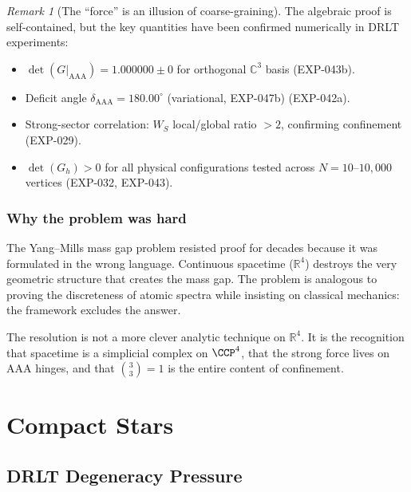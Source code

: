 \documentclass[12pt]{article}
\theoremstyle{remark}
\newtheorem{remark}[theorem]{Remark}
\theoremstyle{definition}
\newcommand{\CC}{\mathbb{C}}
\newcommand{\RR}{\mathbb{R}}
\begin{document}
\begin{remark}[The ``force'' is an illusion of coarse-graining]
The algebraic proof is self-contained, but the key quantities have been
confirmed numerically in DRLT experiments:

\begin{itemize}
\item $\det(G|_{\mathrm{AAA}}) = 1.000000 \pm 0$ for orthogonal
  $\CC^3$ basis (EXP-043b).
\item Deficit angle $\delta_{\mathrm{AAA}} = 180.00^\circ$ (variational, EXP-047b)
  (EXP-042a).
\item Strong-sector correlation: $W_S$ local/global ratio $> 2$,
  confirming confinement (EXP-029).
\item $\det(G_h) > 0$ for all physical configurations tested across
  $N = 10$--$10{,}000$ vertices (EXP-032, EXP-043).
\end{itemize}

\subsubsection{Why the problem was hard}

The Yang--Mills mass gap problem resisted proof for decades because it
was formulated in the wrong language. Continuous spacetime
($\RR^4$) destroys the very geometric structure that creates the
mass gap. The problem is analogous to proving the discreteness of atomic
spectra while insisting on classical mechanics: the framework excludes
the answer.

The resolution is not a more clever analytic technique on $\RR^4$.
It is the recognition that spacetime is a simplicial complex on
$\CCP^4$, that the strong force lives on AAA hinges, and that
$\binom{3}{3} = 1$ is the entire content of confinement.



\section{Compact Stars}
\label{ch:compact_stars}

\subsection{DRLT Degeneracy Pressure}


\end{remark}
\end{document}
